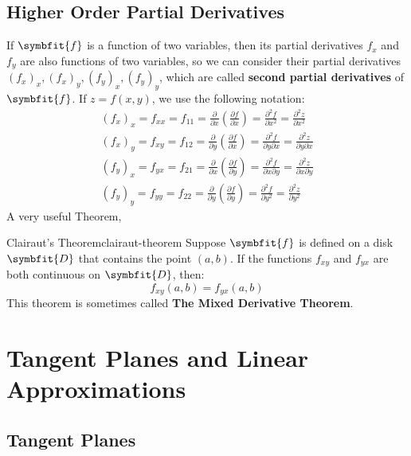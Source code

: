 \documentclass[math,code]{amznotes}
\theoremstyle{remark}
\begin{document}
\subsection{Higher Order Partial Derivatives}
If $\symbfit{f}$ is a function of two variables, then its partial derivatives $f_x$ and $f_y$ are also functions of two variables, so we can consider their partial derivatives $(f_x)_x, (f_x)_y, (f_y)_x, (f_y)_y$, which are called {\color{red} \textbf{second partial derivatives}} of $\symbfit{f}$. If $z=f(x,y)$, we use the following notation:
\begin{gather*}
    (f_x)_x=f_{xx}=f_{11}=\frac{\partial}{\partial x}(\frac{\partial f}{\partial x})=\frac{\partial ^2 f}{\partial x^2}=\frac{\partial ^2 z}{\partial x^2} \\
    (f_x)_y=f_{xy}=f_{12}=\frac{\partial}{\partial y}(\frac{\partial f}{\partial x})=\frac{\partial ^2 f}{\partial y \partial x}=\frac{\partial ^2 z}{\partial y \partial x} \\
    (f_y)_x=f_{yx}=f_{21}=\frac{\partial}{\partial x}(\frac{\partial f}{\partial y})=\frac{\partial ^2 f}{\partial x \partial y}=\frac{\partial ^2 z}{\partial x \partial y} \\
    (f_y)_y=f_{yy}=f_{22}=\frac{\partial}{\partial y}(\frac{\partial f}{\partial y})=\frac{\partial ^2 f}{\partial y^2}=\frac{\partial ^2 z}{\partial y^2}
\end{gather*}
A very useful Theorem,
\begin{thmbox}{Clairaut's Theorem}{clairaut-theorem}
    Suppose $\symbfit{f}$ is defined on a disk $\symbfit{D}$ that contains the point $(a,b)$. If the functions $f_{xy}$ and $f_{yx}$ are both continuous on $\symbfit{D}$, then:
    \begin{displaymath}
        f_{xy}(a,b)=f_{yx}(a,b)
    \end{displaymath}
    This theorem is sometimes called {\color{red} \textbf{The Mixed Derivative Theorem}}.
\end{thmbox}
\section{Tangent Planes and Linear Approximations}
\subsection{Tangent Planes}
\end{document}
